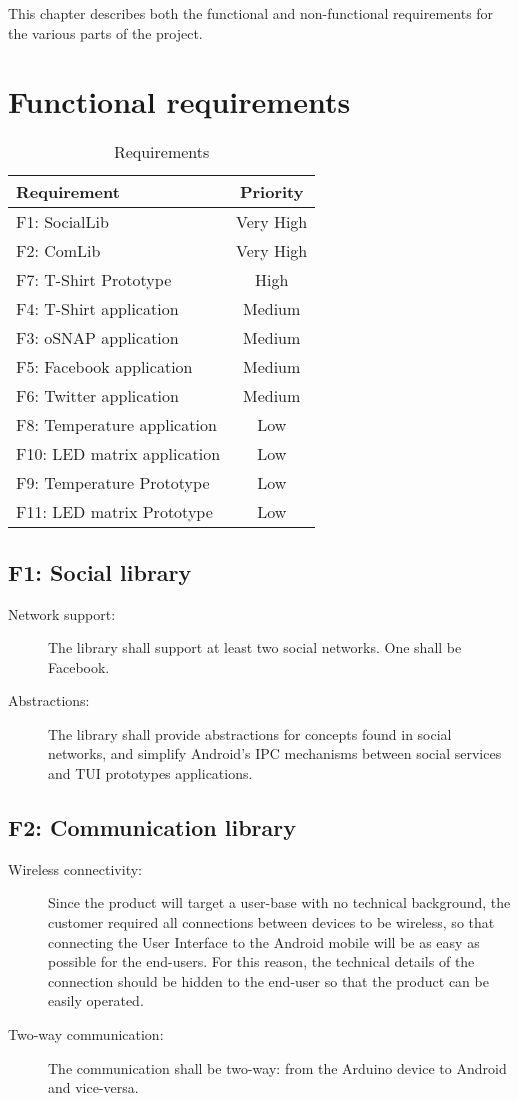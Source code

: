 
This chapter describes both the functional and non-functional requirements
for the various parts of the project.

\section{Functional requirements}

\begin{table}
		\caption{Requirements}
\begin{tabular}{ | l | c | }
	\hline                        
	\bf{Requirement} & \bf{Priority} \\
	\hline
	F1:  SocialLib					& Very High \\
	F2:  ComLib						& Very High \\
	F7:  T-Shirt Prototype			& High \\
	F4:  T-Shirt application		& Medium \\
	F3:  oSNAP application			& Medium \\
	F5:  Facebook application		& Medium \\
	F6:  Twitter application		& Medium \\
	F8:  Temperature application 	& Low \\
	F10: LED matrix application		& Low \\
	F9:  Temperature Prototype		& Low \\
	F11: LED matrix Prototype		& Low \\
	\hline  
\end{tabular}
\end{table}

\subsection{F1: Social library}
\begin{description}
	\item[Network support:] The library shall support at least two social
	networks. One shall be Facebook.
	\item[Abstractions:] The library shall provide abstractions for concepts
	found in social networks, and simplify Android's IPC mechanisms
	between social services and TUI prototypes applications.
\end{description}
	
\subsection{F2: Communication library}
\begin{description}
	\item[Wireless connectivity:] Since the product will target a user-base
	with no technical background, the customer required all connections
	between devices to be wireless, so that connecting the User Interface
	to the Android mobile will be as easy as possible for the end-users.
	For this reason, the technical details of the connection should be
	hidden to the end-user so that the product can be easily operated.
	\item[Two-way communication:] The communication shall be two-way:
	from the Arduino device to Android and vice-versa.
\end{description}

